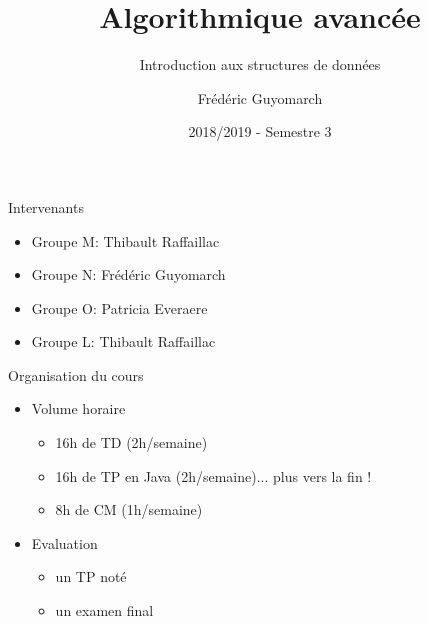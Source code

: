 \documentclass[12pt,a4paper,handout]{beamer}
\title{\textbf{Algorithmique avancée}}
\subtitle{Introduction aux structures de données}
\author{Frédéric Guyomarch}
\date{2018/2019 - Semestre 3}
\institute %
{

  IUT-A \\
  Université de Lille

}
\begin{document}
\begin{frame}
\titlepage
\end{frame}

\begin{frame}{Intervenants}
\begin{itemize}
\item Groupe M: Thibault Raffaillac
\item Groupe N: Frédéric Guyomarch
\item Groupe O: Patricia Everaere
\item Groupe L: Thibault Raffaillac
\end{itemize}
\end{frame}


\begin{frame}{Organisation du cours}


\begin{itemize}
\item Volume horaire
\begin{itemize}
\item 16h de TD (2h/semaine)
\item 16h de TP en Java (2h/semaine)... plus vers la fin !
\item 8h de CM (1h/semaine)
\end{itemize}
\item Evaluation
\begin{itemize}
\item un TP noté
\item un examen final
\end{itemize}
\end{itemize}

\end{frame}
\end{document}
